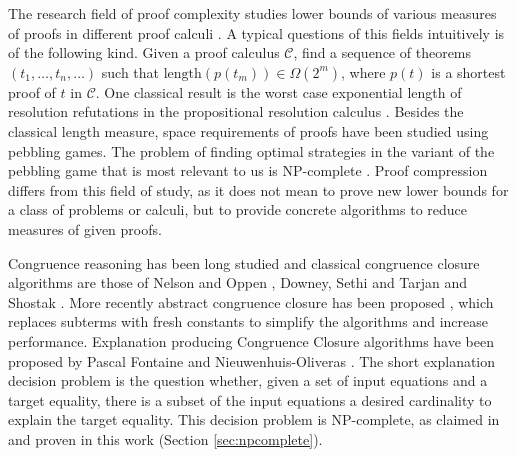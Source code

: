 The research field of proof complexity studies lower bounds of various measures of proofs in different proof calculi \cite{Arora2009,Beame1998a,Cook1979}. 
A typical questions of this fields intuitively is of the following kind. 
Given a proof calculus $\mathcal{C}$, find a sequence of theorems $(t_1,\ldots, t_n, \ldots)$ such that $\mathrm{length}(p(t_m)) \in \Omega(2^m)$, where $p(t)$ is a shortest proof of $t$ in $\mathcal{C}$.
One classical result is the worst case exponential length of resolution refutations in the propositional resolution calculus \cite{Arora2009}.
Besides the classical length measure, space requirements of proofs have been studied \cite{Ben-Sasson2002,Esteban2001,Hopcroft1977,Nordstroem2013,Sethi1975} using pebbling games.
The problem of finding optimal strategies in the variant of the pebbling game that is most relevant to us is NP-complete \cite{Sethi1975}.
Proof compression differs from this field of study, as it does not mean to prove new lower bounds for a class of problems or calculi, but to provide concrete algorithms to reduce measures of given proofs.

Congruence reasoning has been long studied and classical congruence closure algorithms are those of Nelson and Oppen \cite{Nelson1980}, Downey, Sethi and Tarjan \cite{Downey1980} and Shostak \cite{Shostak1978}.
More recently abstract congruence closure has been proposed \cite{Bachmair2000}, which replaces subterms with fresh constants to simplify the algorithms and increase performance.
Explanation producing Congruence Closure algorithms have been proposed by Pascal Fontaine \cite{Fontaine2004} and Nieuwenhuis-Oliveras \cite{Nieuwenhuis2007,Nieuwenhuis2005}.
The short explanation decision problem is the question whether, given a set of input equations and a target equality, there is a subset of the input equations a desired cardinality to explain the target equality.
This decision problem is NP-complete, as claimed in \cite{Nieuwenhuis2005,Nieuwenhuis2007} and proven in this work (Section \ref{sec:npcomplete}).

